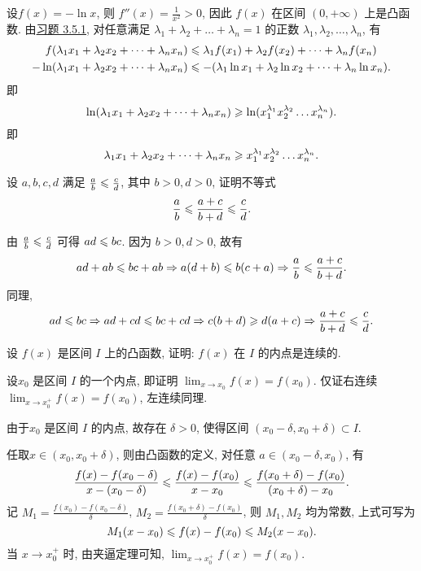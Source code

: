 \begin{solution}
    设$f(x) = -\ln x$, 则 $f''(x) = \frac{1}{x^2} > 0$, 因此 $f(x)$ 在区间 $(0, +\infty)$ 上是凸函数. 由\hyperref[3.5.1]{习题 3.5.1}, 对任意满足 $\lambda_1 + \lambda_2 + \dots + \lambda_n = 1$ 的正数 $\lambda_1, \lambda_2, \dots, \lambda_n$, 有
    \begin{align*}
        f(\lambda_1 x_1 + \lambda_2 x_2 + \dots + \lambda_n x_n)     & \leqslant \lambda_1 f(x_1) + \lambda_2 f(x_2) + \dots + \lambda_n f(x_n)        \\
        -\ln (\lambda_1 x_1 + \lambda_2 x_2 + \dots + \lambda_n x_n) & \leqslant -(\lambda_1 \ln x_1 + \lambda_2 \ln x_2 + \dots + \lambda_n \ln x_n).
    \end{align*}
    即
    $$\ln (\lambda_1 x_1 + \lambda_2 x_2 + \dots + \lambda_n x_n) \geqslant \ln (x_1^{\lambda_1} x_2^{\lambda_2} \dots x_n^{\lambda_n}).$$
    即
    $$\lambda_1 x_1 + \lambda_2 x_2 + \dots + \lambda_n x_n \geqslant x_1^{\lambda_1} x_2^{\lambda_2} \dots x_n^{\lambda_n}.$$
\end{solution}

\begin{exercise}[3.5.3]\label{3.5.3}
    设 $a, b, c, d$ 满足 $\frac{a}{b} \leqslant \frac{c}{d}$, 其中 $b>0, d>0$, 证明不等式
    $$\frac{a}{b} \leqslant \frac{a+c}{b+d} \leqslant \frac{c}{d}.$$
\end{exercise}

\begin{solution}
    由 $\frac{a}{b} \leqslant \frac{c}{d}$ 可得 $ad \leqslant bc$. 因为 $b > 0, d > 0$, 故有
    $$ad + ab \leqslant bc + ab \Rightarrow a(d + b) \leqslant b(c + a) \Rightarrow \frac{a}{b} \leqslant \frac{a + c}{b + d}.$$
    同理,
    $$ad \leqslant bc \Rightarrow ad + cd \leqslant bc + cd \Rightarrow c(b + d) \geqslant d(a + c) \Rightarrow \frac{a + c}{b + d} \leqslant \frac{c}{d}.$$
\end{solution}

\begin{exercise}[3.5.4]
    设 $f(x)$ 是区间 $I$ 上的凸函数, 证明: $f(x)$ 在 $I$ 的内点是连续的.
\end{exercise}

\begin{solution}
    设$x_0$ 是区间 $I$ 的一个内点, 即证明 $\lim_{x \to x_0} f(x) = f(x_0)$.
    仅证右连续$\lim_{x \to x_0^+} f(x) = f(x_0)$, 左连续同理.

    由于$x_0$ 是区间 $I$ 的内点, 故存在 $\delta > 0$, 使得区间 $(x_0-\delta, x_0 + \delta) \subset I$.

    任取$x \in (x_0, x_0 + \delta)$, 则由凸函数的定义, 对任意 $a \in (x_0 - \delta, x_0)$, 有
    $$\frac{f(x) - f(x_0-\delta)}{x - (x_0 - \delta)} \leqslant \frac{f(x)-f(x_0)}{x-x_0} \leqslant \frac{f(x_0 + \delta) - f(x_0)}{(x_0 + \delta) - x_0}.$$
    记 $M_1 = \frac{f(x_0) - f(x_0 - \delta)}{\delta}$, $M_2 = \frac{f(x_0 + \delta) - f(x_0)}{\delta}$, 则 $M_1, M_2$ 均为常数, 上式可写为
    $$M_1(x-x_0) \leqslant f(x) - f(x_0) \leqslant M_2 (x - x_0).$$
    当 $x \to x_0^+$ 时, 由夹逼定理可知, $\lim_{x \to x_0^+} f(x) = f(x_0)$.
\end{solution}

